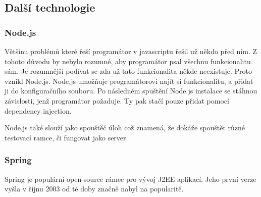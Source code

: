 \documentclass[czech,master,public,dept460,male,cpdeclaration,twoside]{diploma}
\begin{document}
\subsection{Další technologie}

\subsubsection{Node.js}
Většinu problémů které řeší programátor v javascriptu řešil už někdo před ním. Z tohoto důvodu by nebylo rozumné, aby programátor psal všechnu funkcionalitu sám. Je rozumnější podívat se zda už tato funkcionalita někde neexistuje. Proto vznikl Node.js. Node.js umožňuje programátorovi najít si funkcionalitu, a přidat ji do konfiguračního souboru. Po následném spuštění Node.js instalace se stáhnou závislosti, jenž programátor požaduje. Ty pak stačí pouze přidat pomocí dependency injection.

Node.js také slouží jako spouštěč úloh což znamená, že dokáže spouštět různé testovací ramce, či fungovat jako server.

\subsubsection{Spring}
Spring je populární open-source rámec pro vývoj J2EE aplikací. Jeho první verze vyšla v říjnu 2003 od té doby značně nabyl na popularitě. 
\end{document}
